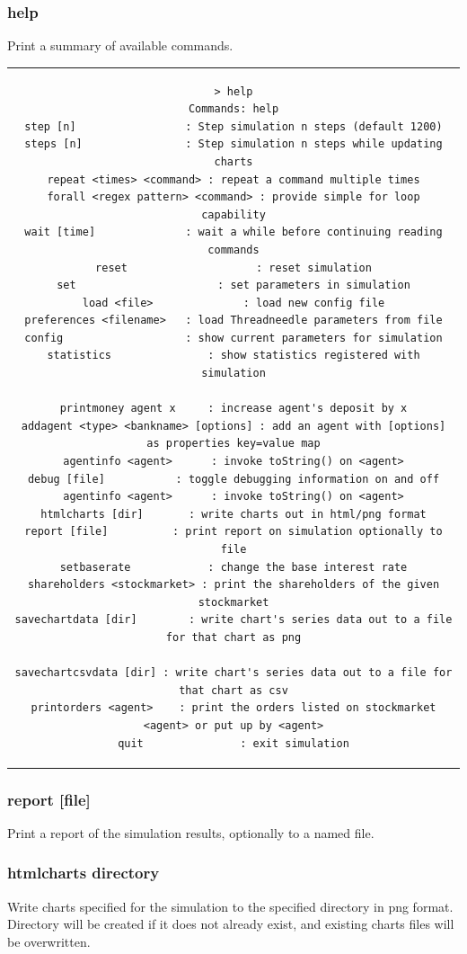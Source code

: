 \documentclass[10pt,oneside,openright, a4paper]{memoir}
\begin{document}
\subsubsection{help}
Print a summary of available commands.
\begin{center}
\begin{tabular}{c}
\begin{lstlisting}
> help
Commands: help
step [n]                 : Step simulation n steps (default 1200)
steps [n]                : Step simulation n steps while updating charts
repeat <times> <command> : repeat a command multiple times
forall <regex pattern> <command> : provide simple for loop capability
wait [time]              : wait a while before continuing reading commands
reset                    : reset simulation
set                      : set parameters in simulation
load <file>              : load new config file
preferences <filename>   : load Threadneedle parameters from file
config                   : show current parameters for simulation
statistics               : show statistics registered with simulation

printmoney agent x     : increase agent's deposit by x
addagent <type> <bankname> [options] : add an agent with [options] as properties key=value map
agentinfo <agent>      : invoke toString() on <agent>
debug [file]           : toggle debugging information on and off
agentinfo <agent>      : invoke toString() on <agent>
htmlcharts [dir]       : write charts out in html/png format
report [file]          : print report on simulation optionally to file
setbaserate            : change the base interest rate
shareholders <stockmarket> : print the shareholders of the given stockmarket
savechartdata [dir]        : write chart's series data out to a file for that chart as png

savechartcsvdata [dir] : write chart's series data out to a file for that chart as csv
printorders <agent>    : print the orders listed on stockmarket <agent> or put up by <agent>
quit               : exit simulation

\end{lstlisting}
\end{tabular}
\end{center}
%
\subsubsection{report [file]}
Print a report of the simulation results, optionally to a named
file.
%
\subsubsection{htmlcharts directory}
Write charts specified for the simulation to the specified directory
in png format. Directory will be created if it does not already 
exist, and existing charts files will be overwritten.
\end{document}
